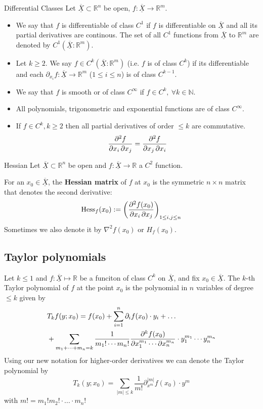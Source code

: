 \documentclass[a4paper,fontsize = 8pt]{scrartcl}
\def\R{\mathbb{R}}
\def\N{\mathbb{N}}
\def\X{\underline{\overline{X}}}
\begin{document}
\begin{mainbox}{Differential Classes}
    Let \(\X \subset \R^n\) be open, $f : \X \to \R^m$. 
    \begin{itemize}
        \item We say that $f$ is differentiable of class $C^1$ if $f$ is differentiable on $\X$ and all its partial derivatives are continous. The set of all $C^1$ functions from $\X$ to $\R^m$ are denoted by $C^1(\X:\R^m)$.
        \item Let $k \geq 2$. We say $f \in C^k(\X:\R^m)$ (i.e. $f$ is of class $C^k$) if its differentiable and each $\partial_{x_i}f: \X \to \R^m$ ($1 \leq i \leq n$) is of class $C^{k-1}$.
        \item We say that $f$ is smooth or of class $C^\infty$ if $f \in C^k, \ \forall k \in \N$.
        \item All polynomials, trigonometric and exponential functions are of class $C^\infty$.
        \item If $f \in C^k, k \geq 2$ then all partial derivatives of order $\leq k$ are commutative.
        $$\pdv{f}{x_i, x_j} = \pdv{f}{ x_j, x_i}$$
    \end{itemize}
\end{mainbox}

\begin{mainbox}{Hessian}
    Let $\X \subset \R^n$ be open and $f: \X \to \R$ a $C^2$ function.

    For an $x_0 \in \X$, the \textbf{Hessian matrix} of $f$ at $x_0$ is the symmetric \(n \times n\) matrix that denotes the second derivative:
    \[\text{Hess}_f(x_0) := \left(\pdv{f(x_0)}{x_i, x_j}\right)_{1\le i,j \le n}\] 
    Sometimes we also denote it by $\nabla^2f(x_0)$ or $H_f(x_0)$.
\end{mainbox}
\subsection{Taylor polynomials}
Let \(k \le 1\) and \(f: \X \mapsto \R\) be a funciton of class \(C^k\) on \(\X\), and fix \(x_0 \in \X\). The \(k\)-th Taylor polynomial of \(f\) at the point \(x_0\) is the polynomial in \(n\) variables of degree \(\le k\) given by
\begin{align*}
  &T_k f(y; x_0) = f(x_0) + \sum_{i=1}^n \partial_i f(x_0) \cdot y_i + \dots \\
  &+ \sum_{m_1 + \cdots + m_n = k} \frac{1}{m_1! \cdots m_n!} \pdv{^k f(x_0) }{x_1^{m_1} \cdots \partial x_n^{m_n}} \cdot y_1^{m_1} \cdots y_n^{m_n}
\end{align*}
Using our new notation for higher-order derivatives we can denote the Taylor polynomial by
\[T_k(y; x_0) = \sum_{|m| \leq k} \frac{1}{m!}\partial_{x^m}^{|m|}f(x_0)\cdot y^m\]
with $m! = m_1!m_2!\cdot ... \cdot m_n!$
\end{document}
